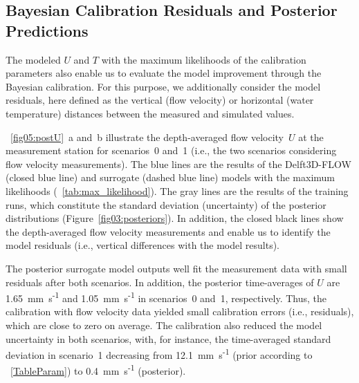 \documentclass[draft,linenumbers,onecolumn]{agujournal2019} %
\begin{document}
\subsection{Bayesian Calibration Residuals and Posterior Predictions}

The modeled $U$ and $T$ with the maximum likelihoods of the calibration parameters also enable us to evaluate the model improvement through the Bayesian calibration. For this purpose, we additionally consider the model residuals, here defined as the vertical (flow velocity) or horizontal (water temperature) distances between the measured and simulated values. 

\figurename{~\ref{fig05:postU}}~a and~b illustrate the depth-averaged flow velocity~$U$ at the measurement station for scenarios~0 and~1 (i.e., the two scenarios considering flow velocity measurements). The blue lines are the results of the Delft3D-FLOW (closed blue line) and surrogate (dashed blue line) models with the maximum likelihoods (\tablename{~\ref{tab:max_likelihood}}). The gray lines are the results of the training runs, which constitute the standard deviation (uncertainty) of the posterior distributions (Figure~\ref{fig03:posteriors}). In addition, the closed black lines show the depth-averaged flow velocity measurements and enable us to identify the model residuals (i.e., vertical differences with the model results).

The posterior surrogate model outputs well fit the measurement data with small residuals after both scenarios. In addition, the posterior time-averages of $U$ are 1.65~mm~s\textsuperscript{-1} and 1.05~mm~s\textsuperscript{-1} in scenarios~0 and~1, respectively. Thus, the calibration with flow velocity data yielded small calibration errors (i.e., residuals), which are close to zero on average. The calibration also reduced the model uncertainty in both scenarios, with, for instance, the time-averaged standard deviation in scenario~1 decreasing from 12.1~mm~s\textsuperscript{-1} (prior according to \tablename{~\ref{TableParam}}) to 0.4~mm~s\textsuperscript{-1} (posterior).
\end{document}
